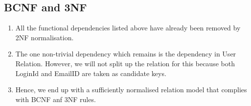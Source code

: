 \documentclass[a4paper]{article}
\begin{document}
\begin{enumerate}
\end{enumerate}


\subsection{BCNF and 3NF}
\begin{enumerate}
\item All the functional dependencies listed above have already been removed by 2NF normalisation.
\item The one non-trivial dependency which remains is the dependency in User Relation. However, we will not split up the relation for this because both LoginId and EmailID are taken as candidate keys.
\item Hence, we end up with a sufficiently normalised relation model that complies with BCNF anf 3NF rules.
\end{enumerate}
\end{document}
